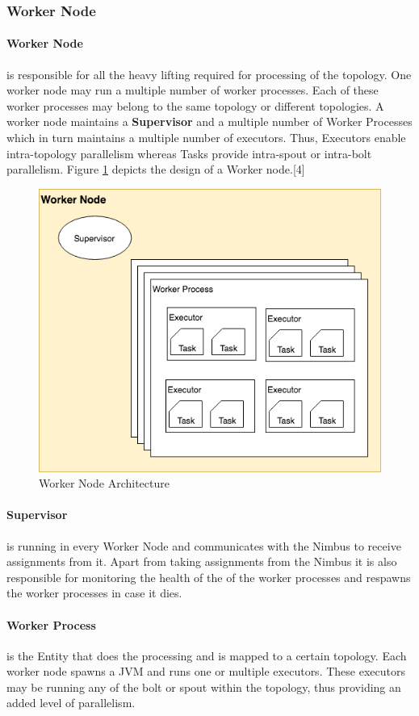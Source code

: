 \documentclass[runningheads,a4paper]{llncs}[2015/06/24]
\begin{document}
\subsubsection{Worker Node}
\paragraph{Worker Node} is responsible for all the heavy lifting required for processing of the topology. One worker node may run a multiple number of worker processes. Each of these worker processes may belong to the same topology or different topologies. A worker node maintains a \textbf{Supervisor} and a multiple number of Worker Processes which in turn maintains a multiple number of executors. Thus, Executors enable intra-topology parallelism whereas Tasks provide intra-spout or intra-bolt parallelism. Figure \ref{fig:workerarch} depicts the design of a Worker node.[4]

\begin{figure}
  \begin{center}
    \includegraphics[width=.7\textwidth]{worker.png}
    \caption{Worker Node Architecture}
    \label{fig:workerarch}
   \end{center}
\end{figure}

\paragraph{Supervisor} is running in every Worker Node and communicates with the Nimbus to receive assignments from it. Apart from taking assignments from the Nimbus it is also responsible for monitoring the health of the of the worker processes and respawns the worker processes in case it dies.

\paragraph{Worker Process} is the Entity that does the processing and is mapped to a certain topology. Each worker node spawns a JVM and runs one or multiple executors. These executors may be running any of the bolt or spout within the topology, thus providing an added level of parallelism.
\end{document}
